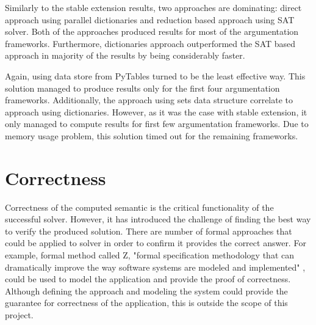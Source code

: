 Similarly to the stable extension results, two approaches are dominating: direct approach using parallel dictionaries and reduction based approach using SAT solver. Both of the approaches produced results for most of the argumentation frameworks. Furthermore, dictionaries approach outperformed the SAT based approach in majority of the results by being considerably faster.


Again, using data store from PyTables turned to be the least effective way. This solution managed to produce results only for the first four argumentation frameworks. Additionally, the approach using sets data structure correlate to approach using dictionaries. However, as it was the case with stable extension, it only managed to compute results for first few argumentation frameworks. Due to memory usage problem, this solution timed out for the remaining frameworks.


\section{Correctness}
Correctness of the computed semantic is the critical functionality of the successful solver. However, it has introduced the challenge of finding the best way to verify the produced solution. There are number of formal approaches that could be applied to solver in order to confirm it provides the correct answer. For example, formal method called Z, "formal specification methodology that can dramatically improve the way software systems are modeled and implemented" \citep{potter1996introduction}, could be used to model the application and provide the proof of correctness. Although defining the approach and modeling the system could provide the guarantee for correctness of the application, this is outside the scope of this project. 

